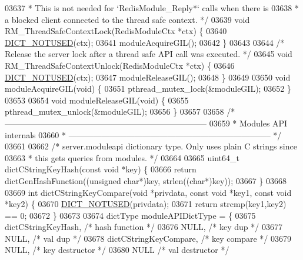 \begin{DoxyCode}
{{{{{{{{{{03637 \textcolor{comment}{ * This is not needed for `RedisModule\_Reply*` calls when there is}
03638 \textcolor{comment}{ * a blocked client connected to the thread safe context. */}
03639 \textcolor{keywordtype}{void} RM\_ThreadSafeContextLock(RedisModuleCtx *ctx) \{
03640     \hyperlink{dict_8h_aa077e877a37a7dc65056290a2c9760da}{DICT\_NOTUSED}(ctx);
03641     moduleAcquireGIL();
03642 \}
03643 
03644 \textcolor{comment}{/* Release the server lock after a thread safe API call was executed. */}
03645 \textcolor{keywordtype}{void} RM\_ThreadSafeContextUnlock(RedisModuleCtx *ctx) \{
03646     \hyperlink{dict_8h_aa077e877a37a7dc65056290a2c9760da}{DICT\_NOTUSED}(ctx);
03647     moduleReleaseGIL();
03648 \}
03649 
03650 \textcolor{keywordtype}{void} moduleAcquireGIL(\textcolor{keywordtype}{void}) \{
03651     pthread\_mutex\_lock(&moduleGIL);
03652 \}
03653 
03654 \textcolor{keywordtype}{void} moduleReleaseGIL(\textcolor{keywordtype}{void}) \{
03655     pthread\_mutex\_unlock(&moduleGIL);
03656 \}
03657 
03658 \textcolor{comment}{/* --------------------------------------------------------------------------}
03659 \textcolor{comment}{ * Modules API internals}
03660 \textcolor{comment}{ * -------------------------------------------------------------------------- */}
03661 
03662 \textcolor{comment}{/* server.moduleapi dictionary type. Only uses plain C strings since}
03663 \textcolor{comment}{ * this gets queries from modules. */}
03664 
03665 uint64\_t dictCStringKeyHash(\textcolor{keyword}{const} \textcolor{keywordtype}{void} *key) \{
03666     \textcolor{keywordflow}{return} dictGenHashFunction((\textcolor{keywordtype}{unsigned} \textcolor{keywordtype}{char}*)key, strlen((\textcolor{keywordtype}{char}*)key));
03667 \}
03668 
03669 \textcolor{keywordtype}{int} dictCStringKeyCompare(\textcolor{keywordtype}{void} *privdata, \textcolor{keyword}{const} \textcolor{keywordtype}{void} *key1, \textcolor{keyword}{const} \textcolor{keywordtype}{void} *key2) \{
03670     \hyperlink{dict_8h_aa077e877a37a7dc65056290a2c9760da}{DICT\_NOTUSED}(privdata);
03671     \textcolor{keywordflow}{return} strcmp(key1,key2) == 0;
03672 \}
03673 
03674 dictType moduleAPIDictType = \{
03675     dictCStringKeyHash,        \textcolor{comment}{/* hash function */}
03676     NULL,                      \textcolor{comment}{/* key dup */}
03677     NULL,                      \textcolor{comment}{/* val dup */}
03678     dictCStringKeyCompare,     \textcolor{comment}{/* key compare */}
03679     NULL,                      \textcolor{comment}{/* key destructor */}
03680     NULL                       \textcolor{comment}{/* val destructor */}
}}}}}}}}}}
\end{DoxyCode}
